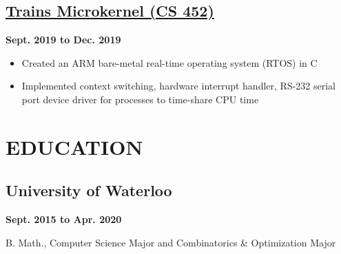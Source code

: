 \documentclass[12pt]{extarticle}
\begin{document}
\subsection*{\href{https://github.com/cgwelcome/train-microkernel}{Trains Microkernel (CS 452)}} \hfill \textbf{Sept. 2019 to Dec. 2019}
\begin{itemize}
  \item Created an ARM bare-metal real-time operating system (RTOS) in C
  \item Implemented context switching, hardware interrupt handler, RS-232 serial port device driver for processes to time-share CPU time
\end{itemize}

\section*{EDUCATION}
\subsection*{University of Waterloo} \hfill \textbf{Sept. 2015 to Apr. 2020}

B. Math., Computer Science Major and Combinatorics \& Optimization Major
\end{document}
